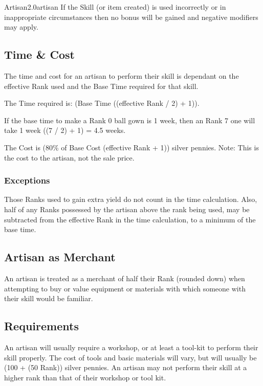 \begin{skill}{Artisan}{2.0}{artisan}
If the Skill (or item created) is used incorrectly or in inappropriate
circumstances then no bonus will be gained and negative modifiers may
apply.

\subsection{Time \& Cost}

The time and cost for an artisan to perform their skill is dependant
on the effective Rank used and the Base Time required for that skill.

The Time required is: (Base Time \x ((effective Rank / 2) + 1)).

\begin{example}
If the base time to make a Rank 0 ball gown is 1 week, then an Rank 7
one will take 1 week \x ((7 / 2) + 1) = 4.5 weeks.
\end{example}

The Cost is (80\% of Base Cost \x (effective Rank + 1)) silver
pennies. Note: This is the cost to the artisan, not the sale price.

\subsubsection{Exceptions}

Those Ranks used to gain extra yield do not count in the time
calculation.  Also, half of any Ranks possessed by the artisan above
the rank being used, may be subtracted from the effective Rank in the
time calculation, to a minimum of the base time.

\subsection{Artisan as Merchant}

An artisan is treated as a merchant of half their Rank (rounded down)
when attempting to buy or value equipment or materials with which
someone with their skill would be familiar.

\subsection{Requirements}

An artisan will usually require a workshop, or at least a tool-kit to
perform their skill properly. The cost of tools and basic materials
will vary, but will usually be (100 + (50 \x Rank)) silver pennies. An
artisan may not perform their skill at a higher rank than that of
their workshop or tool kit.

\end{skill}
